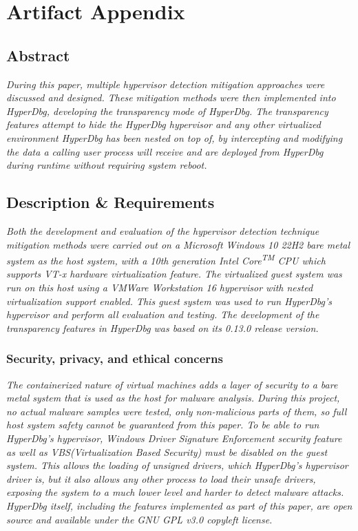 
\section{Artifact Appendix}

\subsection{Abstract}
{\em During this paper, multiple hypervisor detection mitigation approaches were discussed and designed. These mitigation methods were then implemented into HyperDbg, 
developing the transparency mode of HyperDbg. The transparency features attempt to hide the HyperDbg hypervisor and any other virtualized environment HyperDbg has been nested on top of, 
by intercepting and modifying the data a calling user process will receive and are deployed from HyperDbg during runtime without requiring system reboot.}

\subsection{Description \& Requirements}

\textit{Both the development and evaluation of the hypervisor detection technique mitigation methods were carried out
on a Microsoft Windows 10 22H2 bare metal system as the host system, with a 10th generation Intel Core\textsuperscript{TM} CPU which supports VT-x hardware virtualization feature.
The virtualized guest system was run on this host using a VMWare Workstation 16 hypervisor with nested virtualization support enabled.
This guest system was used to run HyperDbg's hypervisor and perform all evaluation and testing. The development of the transparency features in HyperDbg was based on its 0.13.0 release version. }

\subsubsection{Security, privacy, and ethical concerns}
\textit{The containerized nature of virtual machines adds a layer of security to a bare metal system that is used as the host for malware analysis.
During this project, no actual malware samples were tested, only non-malicious parts of them, so full host system safety cannot be guaranteed from this paper.
To be able to run HyperDbg's hypervisor, Windows Driver Signature Enforcement security feature as well as VBS(Virtualization Based Security) must be disabled on the guest system.
This allows the loading of unsigned drivers, which HyperDbg's hypervisor driver is, but it also allows any other process to load their unsafe drivers, 
exposing the system to a much lower level and harder to detect malware attacks. HyperDbg itself, including the features implemented as part of this paper, are open source and available under the GNU GPL v3.0 copyleft license.}

